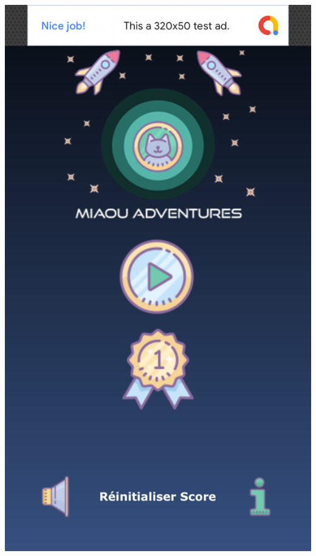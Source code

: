 \documentclass{article}
\begin{document}
\begin{center}
    \includegraphics[scale = 0.18]{images/iOS_1.png}

\end{center}
\end{document}
